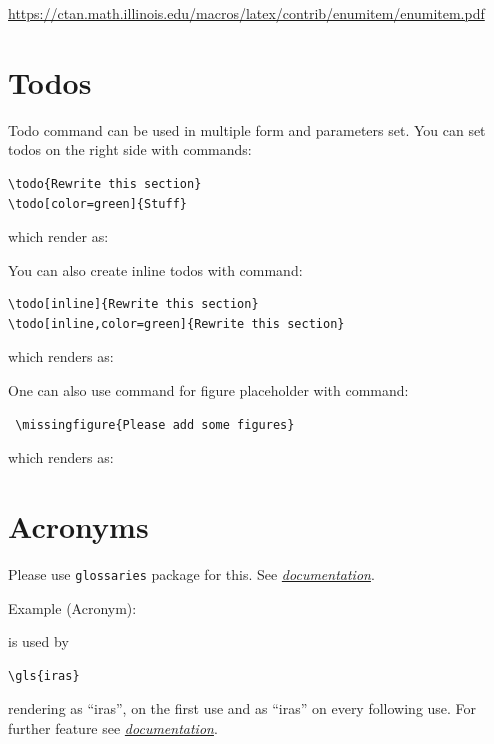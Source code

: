 \url{https://ctan.math.illinois.edu/macros/latex/contrib/enumitem/enumitem.pdf}

\section{Todos}

Todo command can be used in multiple form and parameters set. You can set todos on the right side with commands:
{\small
\begin{verbatim}
\todo{Rewrite this section}
\todo[color=green]{Stuff}
\end{verbatim}
} which render as:




You can also create inline todos with command:
{\small
\begin{verbatim}
\todo[inline]{Rewrite this section}
\todo[inline,color=green]{Rewrite this section}
\end{verbatim}
} which renders as:

One can also use command for figure placeholder with command:
{\small
\begin{verbatim}
 \missingfigure{Please add some figures}
\end{verbatim}
} which renders as:


\section{Acronyms}
Please use \texttt{glossaries} package for this. See \href{https://en.wikibooks.org/wiki/LaTeX/Glossary}{\textit{documentation}}.

Example (Acronym):
{\small
\begin{spverbatim}
\end{spverbatim}
} 
is used by
{\small
\begin{verbatim}
\gls{iras}
\end{verbatim}
}
rendering as ``\gls{iras}'', on the first use and as ``\gls{iras}'' on every following use. For further feature see \href{https://en.wikibooks.org/wiki/LaTeX/Glossary}{\textit{documentation}}.


